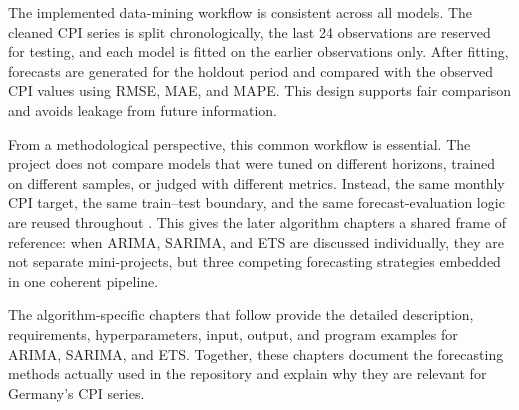 The implemented data-mining workflow is consistent across all models. The cleaned CPI series is split chronologically, the last 24 observations are reserved for testing, and each model is fitted on the earlier observations only. After fitting, forecasts are generated for the holdout period and compared with the observed CPI values using RMSE, MAE, and MAPE. This design supports fair comparison and avoids leakage from future information.

From a methodological perspective, this common workflow is essential. The project does not compare models that were tuned on different horizons, trained on different samples, or judged with different metrics. Instead, the same monthly CPI target, the same train--test boundary, and the same forecast-evaluation logic are reused throughout . This gives the later algorithm chapters a shared frame of reference: when ARIMA, SARIMA, and ETS are discussed individually, they are not separate mini-projects, but three competing forecasting strategies embedded in one coherent pipeline.

The algorithm-specific chapters that follow provide the detailed description, requirements, hyperparameters, input, output, and program examples for ARIMA, SARIMA, and ETS. Together, these chapters document the forecasting methods actually used in the repository and explain why they are relevant for Germany's CPI series.
